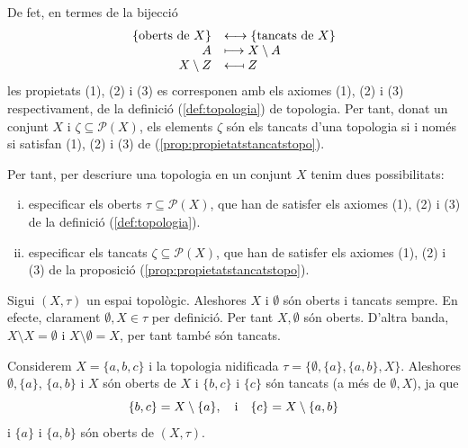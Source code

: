 \documentclass[../main.tex]{subfiles}
\begin{document}
De fet, en termes de la bijecció 
\begin{equation}
    \notag
    \begin{array}{rl}
        \{\text{oberts de $X$}\} & \longleftrightarrow \{\text{tancats de $X$}\}\\
        A & \longmapsto X\setminus A\\
        X\setminus Z & \longmapsfrom Z
    \end{array}
\end{equation}
les propietats (1), (2) i (3) es corresponen amb els axiomes (1), (2) i (3) respectivament, de la definició (\ref{def:topologia}) de topologia. Per tant, donat un conjunt $X$ i $\zeta\subseteq \mathscr{P}(X)$, els elements $\zeta$ són els tancats d'una topologia si i només si satisfan (1), (2) i (3) de (\ref{prop:propietatstancatstopo}).

Per tant, per descriure una topologia en un conjunt $X$ tenim dues possibilitats:
\begin{enumerate}[(i)]
    \item especificar els oberts $\tau\subseteq\mathscr{P}(X)$, que han de satisfer els axiomes (1), (2) i (3) de la definició (\ref{def:topologia}).
    \item especificar els tancats $\zeta\subseteq \mathscr{P}(X)$, que han de satisfer els axiomes (1), (2) i (3) de la proposició (\ref{prop:propietatstancatstopo}).
\end{enumerate}

\begin{ej}
\label{ej:obertsitancats1} Sigui $(X,\tau)$ un espai topològic. Aleshores $X$ i $\emptyset$ són oberts i tancats sempre. En efecte, clarament $\emptyset,X\in\tau$ per definició. Per tant $X,\emptyset$ són oberts. D'altra banda, $X\setminus X = \emptyset$ i $X\setminus \emptyset = X$, per tant també són tancats.
\end{ej}

\begin{ej}
\label{ej:obertsitancats2} Considerem $X = \{a,b,c\}$ i la topologia nidificada $\tau = \{\emptyset,\{a\},\{a,b\},X\}$. Aleshores $\emptyset,\{a\}$, $\{a,b\}$ i $X$ són oberts de $X$ i $\{b,c\}$ i $\{c\}$ són tancats (a més de $\emptyset,X$), ja que
\begin{equation}
    \notag
    \{b,c\} = X\setminus\{a\},\quad \text{i}\quad \{c\} = X\setminus\{a,b\}
\end{equation}
i $\{a\}$ i $\{a,b\}$ són oberts de $(X,\tau)$.
\end{ej}
\end{document}
